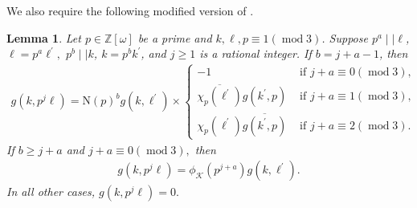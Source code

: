 \documentclass[11pt]{amsart}
\newcommand{\norm}{\mathrm{N}}
\newtheorem{lemma}[prop]{Lemma}
\numberwithin{equation}{section}
\newcommand{\mymod}[1]{(\operatorname{mod} #1)}
\theoremstyle{remark}
\begin{document}
We also require the following modified version of \cite[Lemma 2.8]{DG}.
\begin{lemma}
\label{lemma Gauss sum=0}
Let $p\in \mathbb{Z}[\omega]$ be a prime and $k, \ell, p\equiv 1\mymod{3}$. Suppose $p^a\mid \mid \ell$, $\ell=p^a\ell^\prime,$ $p^b\mid \mid k$, $k=p^bk^\prime$, and $j\ge 1$ is a rational integer. 
If $b=j+a-1$, then
    \begin{align*}
        g(k, p^j\ell)=
        \norm(p)^bg(k, \ell^\prime)
        \times
        \begin{cases}
            -1 &\text{ if } j+a \equiv 0 \mymod{3},\\
            \overline{\chi_p(\ell^\prime)} g(k^\prime, p) &\text{ if } j+a\equiv 1\mymod{3},\\
            \chi_p(\ell^\prime)\overline{g(k^\prime, p)} &\text{ if } j+a\equiv 2\mymod{3}.
        \end{cases}
    \end{align*}
If $b\ge j+a$ and $j+a \equiv 0\mymod{3},$ then
\begin{align*}
    g(k, p^j\ell)=\phi_{\mathcal{K}}(p^{j+a})g(k, \ell^\prime).
\end{align*}
In all other cases, $g(k, p^j\ell)=0.$
\end{lemma}
\end{document}
